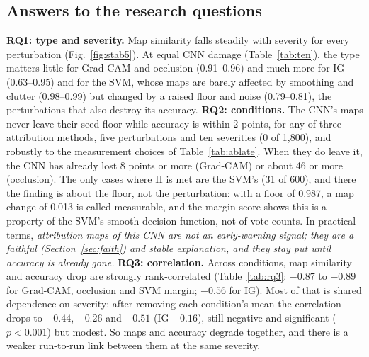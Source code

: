 \documentclass[11pt]{article}
\begin{document}
\subsection{Answers to the research questions}
\textbf{RQ1: type and severity.} Map similarity falls steadily with severity for every perturbation (Fig.~\ref{fig:stab5}). At equal CNN damage (Table~\ref{tab:ten}), the type matters little for Grad-CAM and occlusion (0.91--0.96) and much more for IG (0.63--0.95) and for the SVM, whose maps are barely affected by smoothing and clutter (0.98--0.99) but changed by a raised floor and noise (0.79--0.81), the perturbations that also destroy its accuracy. \textbf{RQ2: conditions.} The CNN's maps never leave their seed floor while accuracy is within 2 points, for any of three attribution methods, five perturbations and ten severities (0 of 1{,}800), and robustly to the measurement choices of Table~\ref{tab:ablate}. When they do leave it, the CNN has already lost 8 points or more (Grad-CAM) or about 46 or more (occlusion). The only cases where H is met are the SVM's (31 of 600), and there the finding is about the floor, not the perturbation: with a floor of 0.987, a map change of 0.013 is called measurable, and the margin score shows this is a property of the SVM's smooth decision function, not of vote counts. In practical terms, \emph{attribution maps of this CNN are not an early-warning signal; they are a faithful (Section~\ref{sec:faith}) and stable explanation, and they stay put until accuracy is already gone.} \textbf{RQ3: correlation.} Across conditions, map similarity and accuracy drop are strongly rank-correlated (Table~\ref{tab:rq3}: $-0.87$ to $-0.89$ for Grad-CAM, occlusion and SVM margin; $-0.56$ for IG). Most of that is shared dependence on severity: after removing each condition's mean the correlation drops to $-0.44$, $-0.26$ and $-0.51$ (IG $-0.16$), still negative and significant ($p<0.001$) but modest. So maps and accuracy degrade together, and there is a weaker run-to-run link between them at the same severity.

\begin{table}[!tb]
\centering
\small

\caption{RQ3. Overall: Spearman correlation between map similarity and own-model accuracy drop over all conditions and runs. Within-condition: Pearson correlation after subtracting each condition's mean (perturbation $\times$ calibration level) from both quantities.}
\label{tab:rq3}
\end{table}
\end{document}
